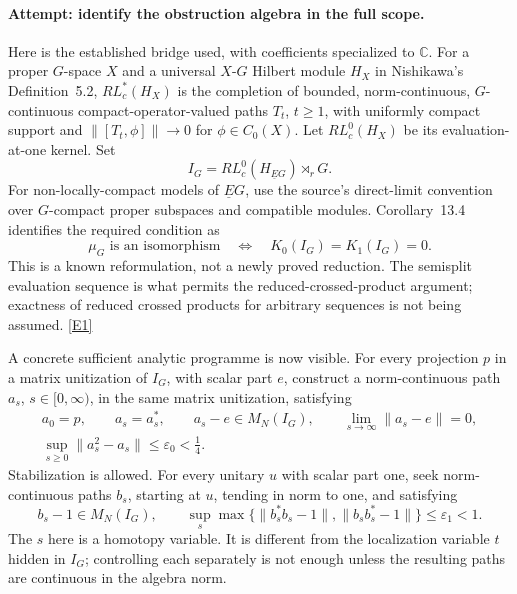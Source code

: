 \documentclass[11pt]{article}
\newcommand{\C}{\mathbb{C}}
\newcommand{\eref}[2]{\hyperlink{extra:#1:#2}{[E#2]}}
\begin{document}
\paragraph{Attempt: identify the obstruction algebra in the full scope.}
Here is the established bridge used, with coefficients specialized to
$\C$. For a proper $G$-space $X$ and a universal $X$-$G$ Hilbert module
$H_X$ in Nishikawa's Definition~5.2, $RL_c^*(H_X)$ is the completion of
bounded, norm-continuous, $G$-continuous compact-operator-valued
paths $T_t$, $t\ge1$,
with uniformly compact support and
$\|[T_t,\phi]\|\to0$ for $\phi\in C_0(X)$.
Let $RL_c^0(H_X)$ be its evaluation-at-one kernel. Set
\begin{equation}\label{ra:53:kernel}
 I_G=RL_c^0(H_{\underline EG})\rtimes_r G.
\end{equation}
For non-locally-compact models of $\underline EG$, use the source's
direct-limit convention over $G$-compact proper subspaces and compatible
modules. Corollary~13.4 identifies the required condition as
\begin{equation}\label{ra:53:obstruction}
 \mu_G\text{ is an isomorphism}
 \quad\Longleftrightarrow\quad K_0(I_G)=K_1(I_G)=0.
\end{equation}
This is a known reformulation, not a newly proved reduction. The
semisplit evaluation sequence is what permits the reduced-crossed-product
argument; exactness of reduced crossed products for arbitrary sequences
is not being assumed. \eref{53}{1}

A concrete sufficient analytic programme is now visible. For every
projection $p$ in a matrix unitization of $I_G$, with scalar part $e$,
construct a norm-continuous path $a_s$, $s\in[0,\infty)$, in the same
matrix unitization, satisfying
\begin{equation}\label{ra:53:program0}
 \begin{gathered}
 a_0=p,\qquad a_s=a_s^*,\qquad a_s-e\in M_N(I_G),\qquad
 \lim_{s\to\infty}\|a_s-e\|=0,\\
 \sup_{s\ge0}\|a_s^2-a_s\|\le\varepsilon_0<\tfrac14.
 \end{gathered}
\end{equation}
Stabilization is allowed. For every unitary $u$ with scalar part one,
seek norm-continuous paths $b_s$, starting at $u$, tending in norm
to one, and satisfying
\begin{equation}\label{ra:53:program1}
 b_s-1\in M_N(I_G),\qquad
 \sup_s\max\{\|b_s^*b_s-1\|,\|b_sb_s^*-1\|\}
 \le\varepsilon_1<1.
\end{equation}
The $s$ here is a homotopy variable. It is different from the localization
variable $t$ hidden in $I_G$; controlling each separately is not enough
unless the resulting paths are continuous in the algebra norm.
\end{document}
